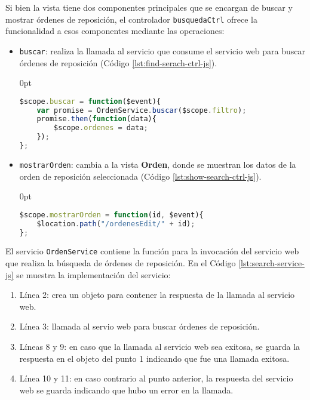 \begin{enumerate}
Si bien la vista tiene dos componentes principales que se encargan de buscar y mostrar órdenes de reposición, el controlador \texttt{busquedaCtrl} ofrece la funcionalidad a esos componentes mediante las operaciones:
\begin{itemize}
	\item \texttt{buscar}: realiza la llamada al servicio que consume el servicio web para buscar órdenes de reposición (Código \ref{lst:find-serach-ctrl-js}).
\begin{adjustwidth}{\listingfixlargewidth}{0pt}
\begin{lstlisting}[language=Javascript, caption={Función para llamar el servicio de búsqueda de órdenes de reposición.}, captionpos=b, label={lst:find-serach-ctrl-js}]
$scope.buscar = function($event){
	var promise = OrdenService.buscar($scope.filtro);
	promise.then(function(data){
		$scope.ordenes = data;
	});
};
\end{lstlisting}
\end{adjustwidth}

	\item \texttt{mostrarOrden}: cambia a la vista \textbf{Orden}, donde se muestran los datos de la orden de reposición seleccionada (Código \ref{lst:show-search-ctrl-js}).
\begin{adjustwidth}{\listingfixlargewidth}{0pt}
\begin{lstlisting}[language=Javascript, caption={Función para mostrar la vista de una orden de reposición.}, captionpos=b, label={lst:show-search-ctrl-js}]
$scope.mostrarOrden = function(id, $event){
	$location.path("/ordenesEdit/" + id);
};
\end{lstlisting}
\end{adjustwidth}
\end{itemize}

El servicio \texttt{OrdenService} contiene la función para la invocación del servicio web que realiza la búsqueda de órdenes de reposición. En el Código \ref{lst:search-service-js} se muestra la implementación del servicio:
\begin{enumerate}
	\item Línea 2: crea un objeto para contener la respuesta de la llamada al servicio web.
	\item Línea 3: llamada al servio web para buscar órdenes de reposición.
	\item Líneas 8 y 9: en caso que la llamada al servicio web sea exitosa, se guarda la respuesta en el objeto del punto 1 indicando que fue una llamada exitosa.
	\item Línea 10 y 11: en caso contrario al punto anterior, la respuesta del servicio web se guarda indicando que hubo un error en la llamada.
\end{enumerate}



\end{enumerate}
